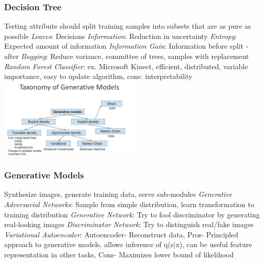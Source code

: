 \documentclass{article}
\begin{document}
\begin{multicols*}{2}
        \subsubsection*{Decision Tree}
        Testing attribute should split training samples into subsets that are as pure as possible\newline
        \textit{Leaves}: Decisions\newline
        \textit{Information}: Reduction in uncertainty\newline
        \textit{Entropy}: Expected amount of information\newline
        \textit{Information Gain}: Information before split - after\newline
        \textit{Bagging}: Reduce variance, committee of trees, samples with replacement\newline
        \textit{Random Forest Classifier}: ex. Microsoft Kinect, efficient, distributed,
        variable importance, easy to update algorithm, cons: interpretability\newline
        \includegraphics[width=0.5\textwidth]{generative_models}
        \subsubsection*{Generative Models}
        Synthesize images, generate training data, serve sub-modules\newline
        \textit{Generative Adversarial Networks}: Sample from simple distribution, learn
        transformation to training distribution\newline
        \textit{Generative Network}: Try to fool discriminator by generating real-looking images\newline
        \textit{Discriminator Network}: Try to distinguish real/fake images\newline
        \textit{Variational Autoencoder}: Autoencoder- Reconstruct data, Pros- Principled
        approach to generative models, allows inference of q(z$\mid$x), can be useful feature
        representation in other tasks, Cons- Maximizes lower bound of likelihood

\end{multicols*}
\end{document}

